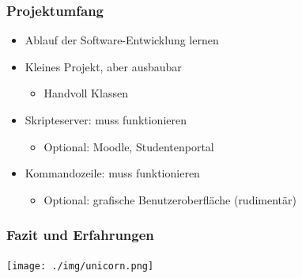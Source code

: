 \documentclass{beamer}
\begin{document}
	\begin{frame}
	\frametitle{Projektumfang}
	\begin{itemize}
		\item Ablauf der Software-Entwicklung lernen
		\item Kleines Projekt, aber ausbaubar
			\begin{itemize}
				\item Handvoll Klassen
			\end{itemize}
		\pause
		\item Skripteserver: muss funktionieren
			\begin{itemize}
				\item Optional: Moodle, Studentenportal
			\end{itemize}
		\item Kommandozeile: muss funktionieren
			\begin{itemize}
				\item Optional: grafische Benutzeroberfläche (rudimentär)
			\end{itemize}
	\end{itemize}
	\end{frame}
	
	\begin{frame}
	\frametitle{Fazit und Erfahrungen}
	\begin{center}
	\texttt{[image: ./img/unicorn.png]}
	\end{center}
	\end{frame}
	
\end{document}
